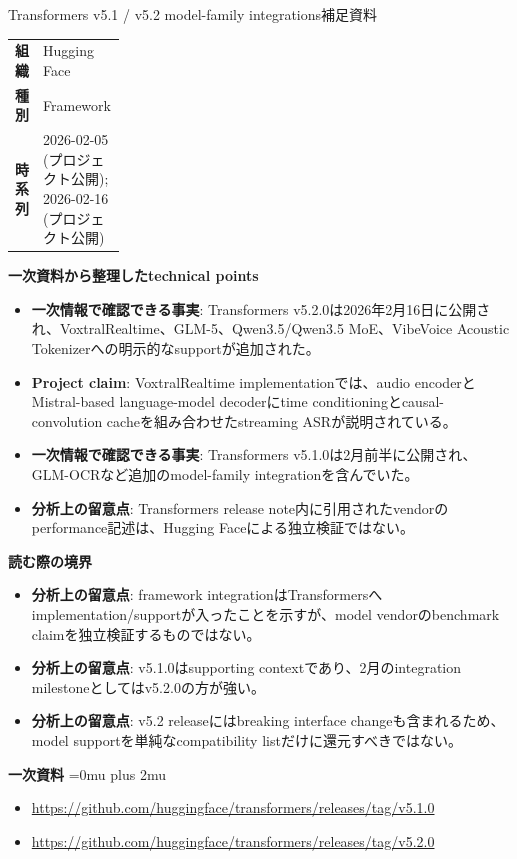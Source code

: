 \begin{technicalnote}{Transformers v5.1 / v5.2 model-family integrations}{補足資料}
\begingroup
\begin{tabularx}{\linewidth}{@{}>{\bfseries}p{0.22\linewidth}X@{}}
組織 & Hugging Face \\
種別 & Framework \\
時系列 & 2026-02-05 (プロジェクト公開); 2026-02-16 (プロジェクト公開) \\
\end{tabularx}
\smallskip
{\bfseries 一次資料から整理したtechnical points}
\begin{itemize}[leftmargin=1.5em,itemsep=0.35em]
\item \textbf{一次情報で確認できる事実}: Transformers v5.2.0は2026年2月16日に公開され、VoxtralRealtime、GLM-5、Qwen3.5/Qwen3.5 MoE、VibeVoice Acoustic Tokenizerへの明示的なsupportが追加された。
\item \textbf{Project claim}: VoxtralRealtime implementationでは、audio encoderとMistral-based language-model decoderにtime conditioningとcausal-convolution cacheを組み合わせたstreaming ASRが説明されている。
\item \textbf{一次情報で確認できる事実}: Transformers v5.1.0は2月前半に公開され、GLM-OCRなど追加のmodel-family integrationを含んでいた。
\item \textbf{分析上の留意点}: Transformers release note内に引用されたvendorのperformance記述は、Hugging Faceによる独立検証ではない。
\end{itemize}
\begin{minipage}{\linewidth}
{\bfseries 読む際の境界}
\begin{itemize}[leftmargin=1.5em,itemsep=0.35em]
\item \textbf{分析上の留意点}: framework integrationはTransformersへimplementation/supportが入ったことを示すが、model vendorのbenchmark claimを独立検証するものではない。
\item \textbf{分析上の留意点}: v5.1.0はsupporting contextであり、2月のintegration milestoneとしてはv5.2.0の方が強い。
\item \textbf{分析上の留意点}: v5.2 releaseにはbreaking interface changeも含まれるため、model supportを単純なcompatibility listだけに還元すべきではない。
\end{itemize}
\begin{samepage}
{\bfseries 一次資料}
\begingroup\sloppy
\Urlmuskip=0mu plus 2mu\relax
\begin{itemize}[leftmargin=1.5em,itemsep=0.25em]
\item {\scriptsize\url{https://github.com/huggingface/transformers/releases/tag/v5.1.0}}
\item {\scriptsize\url{https://github.com/huggingface/transformers/releases/tag/v5.2.0}}
\end{itemize}
\endgroup
\end{samepage}
\end{minipage}
\endgroup
\end{technicalnote}
\medskip
